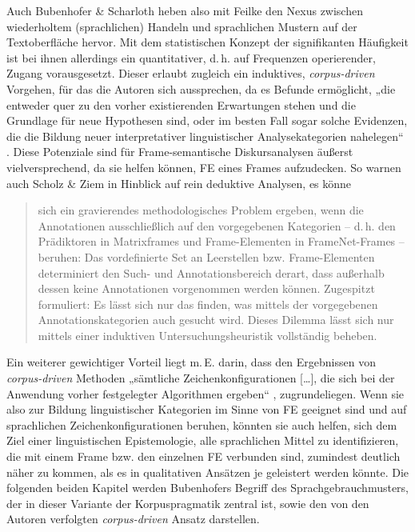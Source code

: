 Auch Bubenhofer \& Scharloth heben also mit Feilke den Nexus zwischen wiederholtem (sprachlichen) Handeln und sprachlichen Mustern auf der Textoberfläche hervor. Mit dem statistischen Konzept der signifikanten Häufigkeit ist bei ihnen allerdings ein quantitativer, d.\,h. auf Frequenzen operierender, Zugang vorausgesetzt. Dieser erlaubt zugleich ein induktives, \emph{corpus-driven} \autocite{tognini-bonelliCorpusLinguisticsWork2001} Vorgehen, für das die Autoren sich aussprechen, da es Befunde ermöglicht, „die entweder quer zu den vorher existierenden Erwartungen stehen und die Grundlage für neue Hypothesen sind, oder im besten Fall sogar solche Evidenzen, die die Bildung neuer interpretativer linguistischer Analysekategorien nahelegen`` \autocite[149]{bubenhoferKorpuslinguistischeDiskursanalyseNutzen2013}. Diese Potenziale sind für Frame-semantische Diskursanalysen äußerst vielversprechend, da sie helfen können, FE eines Frames aufzudecken. So warnen auch Scholz \& Ziem in Hinblick auf rein deduktive Analysen, es könne

\begin{quote}
sich ein gravierendes methodologisches Problem ergeben, wenn die Annotationen ausschließlich auf den vorgegebenen Kategorien -- d.\,h. den Prädiktoren in Matrixframes und Frame-Elementen in FrameNet-Frames -- beruhen: Das vordefinierte Set an Leerstellen bzw. Frame-Elementen determiniert den Such- und Annotationsbereich derart, dass außerhalb dessen keine Annotationen vorgenommen werden können. Zugespitzt formuliert: Es lässt sich nur das finden, was mittels der vorgegebenen Annotationskategorien auch gesucht wird. Dieses Dilemma lässt sich nur mittels einer induktiven Untersuchungsheuristik vollständig beheben. \autocite[306]{scholzVokabularImDiskurshistorischen2015}
\end{quote}

Ein weiterer gewichtiger Vorteil liegt m.\,E. darin, dass den Ergebnissen von \emph{corpus-driven} Methoden „sämtliche Zeichenkonfigurationen {[}\ldots{]}, die sich bei der Anwendung vorher festgelegter Algorithmen ergeben`` \autocite[149]{bubenhoferKorpuslinguistischeDiskursanalyseNutzen2013}, zugrundeliegen. Wenn sie also zur Bildung linguistischer Kategorien im Sinne von FE geeignet sind und auf sprachlichen Zeichenkonfigurationen beruhen, könnten sie auch helfen, sich dem Ziel einer linguistischen Epistemologie, alle sprachlichen Mittel zu identifizieren, die mit einem Frame bzw. den einzelnen FE verbunden sind, zumindest deutlich näher zu kommen, als es in qualitativen Ansätzen je geleistert werden könnte. Die folgenden beiden Kapitel werden Bubenhofers \autocite*{bubenhoferSprachgebrauchsmusterKorpuslinguistikAls2009} Begriff des Sprachgebrauchmusters, der in dieser Variante der Korpuspragmatik zentral ist, sowie den von den Autoren verfolgten \emph{corpus-driven} Ansatz darstellen.


